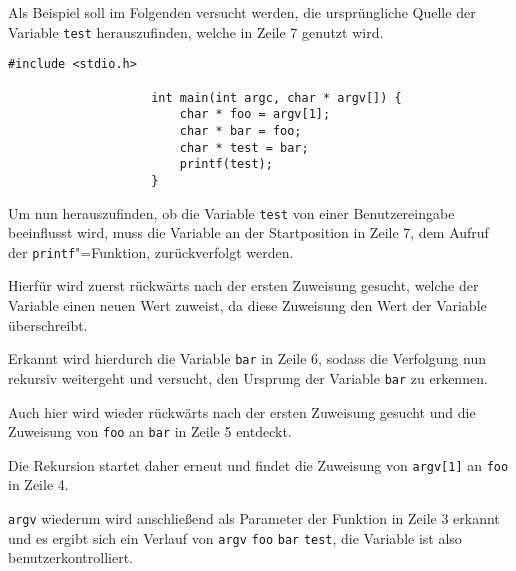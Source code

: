                Als Beispiel soll im Folgenden versucht werden,
                die ursprüngliche Quelle der Variable
                \lstinline{test} herauszufinden,
                welche in Zeile 7 genutzt wird.

                \begin{lstlisting}[caption={Beispiel für eine Variablenrückverfolgung}, label={lst:Variablenrückverfolgung}, gobble=20]
                    #include <stdio.h>

                    int main(int argc, char * argv[]) {
                        char * foo = argv[1];
                        char * bar = foo;
                        char * test = bar;
                        printf(test);
                    }
                \end{lstlisting}

                Um nun herauszufinden,
                ob die Variable
                \lstinline{test} von einer Benutzereingabe beeinflusst wird,
                muss die Variable an der Startposition in Zeile 7,
                dem Aufruf der
                \lstinline{printf}"=Funktion,
                zurückverfolgt werden.

                Hierfür wird zuerst rückwärts nach der ersten Zuweisung gesucht,
                welche der Variable einen neuen Wert zuweist,
                da diese Zuweisung den Wert der Variable überschreibt.

                Erkannt wird hierdurch die Variable
                \lstinline{bar} in Zeile 6,
                sodass die Verfolgung nun rekursiv weitergeht und
                versucht,
                den Ursprung der Variable
                \lstinline{bar} zu erkennen.

                Auch hier wird wieder rückwärts nach der ersten Zuweisung gesucht und
                die Zuweisung von
                \lstinline{foo} an
                \lstinline{bar} in Zeile 5 entdeckt.

                Die Rekursion startet daher erneut und
                findet die Zuweisung von
                \lstinline|argv[1]| an
                \lstinline{foo} in Zeile 4.

                \lstinline{argv} wiederum wird anschließend als Parameter der Funktion in Zeile 3 erkannt und
                es ergibt sich ein Verlauf von
                \lstinline{argv}
                \textrightarrow{}
                \lstinline{foo}
                \textrightarrow{}
                \lstinline{bar}
                \textrightarrow{}
                \lstinline{test},
                die Variable ist also benutzerkontrolliert.

